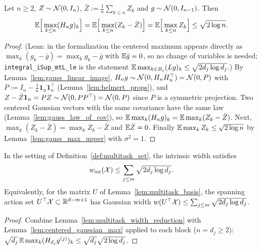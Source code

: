 \begin{lemma}\label{lem:centered_gaussian_max}
\leanok
{}
Let $n \ge 2$, $Z \sim \mathcal{N}(0, I_n)$, $\bar Z := \frac1n\sum_{k\le n}Z_k$ and
$g \sim \mathcal{N}(0, I_{n-1})$. Then
\[
  \mathbb{E}\Big[\max_{k\le n}(H_ng)_k\Big] = \mathbb{E}\Big[\max_{k\le n}(Z_k - \bar Z)\Big]
  = \mathbb{E}\Big[\max_{k\le n}Z_k\Big] \le \sqrt{2\log n}.
\]
\end{lemma}

\begin{proof}
\leanok
{}
(Lean: in the formalization the centered maximum appears directly as
$\max_k(g_k - \bar g) = \max_kg_k - \bar g$ with $\mathbb{E}\bar g = 0$, so no change of
variables is needed; \texttt{integral\_iSup\_mtL\_le} is the statement
$\mathbb{E}\max_{k\in B_j}(Lg)_k \le \sqrt{2d_j\log d_j}$.)
By Lemma~\ref{lem:gauss_linear_image}, $H_ng \sim \mathcal{N}(0, H_nH_n^\top) = \mathcal{N}(0, P)$
with $P := I_n - \frac1n\mathbf 1_n\mathbf 1_n^\top$ (Lemma~\ref{lem:helmert_props}), and
$Z - \bar Z\mathbf 1_n = PZ \sim \mathcal{N}(0, PP^\top) = \mathcal{N}(0,P)$ since $P$ is a symmetric
projection. Two centered Gaussian vectors with the same covariance have the same law
(Lemma~\ref{lem:gauss_law_of_cov}), so $\mathbb{E}\max_k(H_ng)_k = \mathbb{E}\max_k(Z_k - \bar Z)$. Next,
$\max_k(Z_k - \bar Z) = \max_kZ_k - \bar Z$ and $\mathbb{E}\bar Z = 0$. Finally
$\mathbb{E}\max_kZ_k \le \sqrt{2\log n}$ by Lemma~\ref{lem:gauss_max_upper} with $\sigma^2 = 1$.
\end{proof}

\begin{proposition}\label{prop:width_multitask}
\leanok
{}
In the setting of Definition~\ref{def:multitask_set}, the intrinsic width satisfies
\[
  w_{\mathrm{int}}(\mathcal{X}) \le \sum_{j\le m}\sqrt{2 d_j\log d_j}.
\]
Equivalently, for the matrix $U$ of Lemma~\ref{lem:multitask_basis}, the spanning action set
$U^\top\mathcal{X} \subset \mathbb{R}^{d-m+1}$ has Gaussian width $w(U^\top\mathcal{X}) \le \sum_{j\le m}\sqrt{2d_j\log d_j}$.
\end{proposition}

\begin{proof}
\leanok
{}
Combine Lemma~\ref{lem:multitask_width_reduction} with Lemma~\ref{lem:centered_gaussian_max}
applied to each block ($n = d_j \ge 2$):
$\sqrt{d_j}\,\mathbb{E}\max_k(H_{d_j}g^{(j)})_k \le \sqrt{d_j}\sqrt{2\log d_j}$.
\end{proof}

